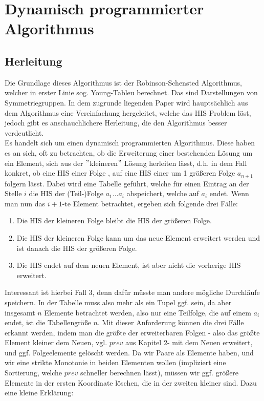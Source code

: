 

\section{Dynamisch programmierter Algorithmus \cite{dynamisch}}

\subsection{Herleitung}
Die Grundlage dieses Algorithmus ist der Robinson-Schensted Algorithmus, welcher in erster Linie sog. Young-Tableu berechnet. Das sind Darstellungen von Symmetriegruppen. In dem zugrunde liegenden Paper wird hauptsächlich aus dem Algorithmus eine Vereinfachung hergeleitet, welche das HIS Problem löst, jedoch gibt es anschauchlichere Herleitung, die den Algorithmus besser verdeutlicht.\\
Es handelt sich um einen dynamisch programmierten Algorithmus. Diese haben es an sich, oft zu betrachten, ob die Erweiterung einer bestehenden Lösung um ein Element, sich aus der $"$kleineren$"$ Lösung herleiten lässt, d.h. in dem Fall konkret, ob eine HIS einer Folge \an, auf eine HIS einer um 1 größeren Folge \an$a_{n+1}$ folgern lässt. Dabei wird eine Tabelle geführt, welche für einen Eintrag an der Stelle $i$ die HIS der (Teil-)Folge $a_1\dots a_i$ abspeichert, welche auf $a_i$ endet. Wenn man nun das $i+1$-te Element betrachtet, ergeben sich folgende drei Fälle:
\begin{enumerate}
    \item Die HIS der kleineren Folge bleibt die HIS der größeren Folge.
    \item Die HIS der kleineren Folge kann um das neue Element erweitert werden und ist danach die HIS der größeren Folge.
    \item Die HIS endet auf dem neuen Element, ist aber nicht die vorherige HIS erweitert.
\end{enumerate}
Interessant ist hierbei Fall 3, denn dafür müsste man andere mögliche Durchläufe speichern. In der Tabelle muss also mehr als ein Tupel ggf. sein, da aber insgesamt $n$ Elemente betrachtet werden, also nur eine Teilfolge, die auf einem $a_i$ endet, ist die Tabellengröße $n$. 
Mit dieser Anforderung können die drei Fälle erkannt werden, indem man die größte der erweiterbaren Folgen - also das größte Element kleiner dem Neuen, vgl. $prev$ aus Kapitel 2- mit dem Neuen erweitert, und ggf. Folgeelemente gelöscht werden. Da wir Paare als Elemente haben, und wir eine strikte Monotonie in beiden Elementen wollen (impliziert eine Sortierung, welche $prev$ schneller berechnen lässt), müssen wir ggf. größere Elemente in der ersten Koordinate löschen, die in der zweiten kleiner sind. Dazu eine kleine Erklärung:\\ 
